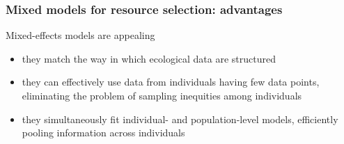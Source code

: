 \documentclass[10pt]{beamer}
\begin{document}

\begin{frame}[fragile]
\frametitle{Mixed models for resource selection: advantages}

Mixed-effects models are appealing

\begin{itemize}
\item they match the way in which ecological data are structured
\item they can effectively use data from individuals having few data points, eliminating the problem of sampling inequities among individuals
\item they simultaneously fit individual- and population-level models, efficiently pooling information across individuals
\end{itemize}

\end{frame}

% 
% 
% 
% 
\end{document}
